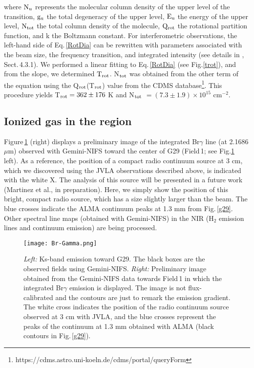 \documentclass[baaa]{baaa}
\begin{document}
\noindent
where ${\rm N_u}$ represents the molecular column density of the upper level of the transition, ${\rm g_u}$  the total degeneracy of the upper level, ${\rm E_u}$ the energy of the upper level, ${\rm N_{tot}}$ the total column density of the molecule, ${\rm Q_{rot}}$ the rotational partition function, and k the Boltzmann constant. For interferometric observations, the left-hand side of Eq.\,\ref{RotDia} can be rewritten with parameters associated with the beam size, the frequency transition, and integrated intensity (see details in \citealt{ortega23}, Sect.\,4.3.1).
We performed a linear fitting to Eq.\,\ref{RotDia} (see Fig.\ref{trot}), and from the slope, we determined ${\rm T_{rot}}$. N$\rm_{tot}$ was obtained from the other term of the equation using the Q$\rm_{rot}$(T$\rm_{rot}$) value from the CDMS database\footnote{https://cdms.astro.uni-koeln.de/cdms/portal/queryForm}. This procedure yields T$_{\rm rot} = 362\pm176$ K and N$_{\rm tot}$ $ = (7.3\pm1.9)\times10^{15}$ cm$^{-2}$.  

\subsection{Ionized gas in the region}

Figure\,\ref{gemini} (right) displays a preliminary image of the integrated Br$\gamma$ line (at 2.1686 $\mu$m) observed with Gemini-NIFS toward the center of G29 (Field\,1; see Fig.\ref{gemini} left). As a reference, the position of a compact radio continuum source at 3 cm, which we discovered using the JVLA observations described above, is indicated with the white X. The analysis of this source will be presented in a future work (Martinez et al., in preparation). Here, we simply show the position of this bright, compact radio source, which has a size slightly larger than the beam.
The blue crosses indicate the ALMA continuum peaks at 1.3 mm from Fig.\,\ref{g29}. Other spectral line maps (obtained with Gemini-NIFS) in the NIR (H$_{2}$ emission lines and continuum emission) are being processed.

\begin{figure}
    \centering
    \texttt{[image: Br-Gamma.png]}
    \caption{\textit{Left:} Ks-band emission toward G29. The black boxes are the observed fields using Gemini-NIFS. \textit{Right:} Preliminary image obtained from the Gemini-NIFS data towards Field\,1 in which the integrated Br$\gamma$ emission is displayed. The image is not flux-calibrated and the contours are just to remark the emission gradient. The white cross indicates the position of the radio continuum source observed at 3 cm with JVLA, and the blue crosses represent the peaks of the continuum at 1.3 mm obtained with ALMA (black contours in Fig.\,\ref{g29}).}
    \label{gemini}
\end{figure} 
\end{document}
